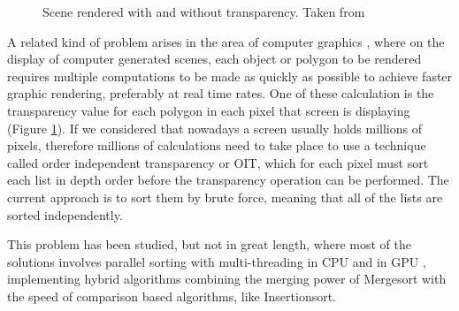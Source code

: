 \documentclass[a4paper,12pt]{article}
\begin{document}
\begin{figure}[H]
\centering
{}
\hfill %
\caption{Scene rendered with and without transparency. Taken from \cite{Arch2015}}
\label{fig:Transp}
\end{figure}

A related kind of problem arises in the area of computer graphics \cite{Arch2015}, where on the display of computer generated scenes, each object or polygon to be rendered requires multiple computations to be made as quickly as possible to achieve faster graphic rendering, preferably at real time rates. One of these calculation is the transparency value for each polygon in each pixel that screen is displaying (Figure \ref{fig:Transp}). If we considered that nowadays a screen usually holds millions of pixels, therefore millions of calculations need to take place to use a technique called order independent transparency or OIT, which for each pixel must sort each list in depth order before the transparency operation can be performed. The current approach is to sort them by brute force, meaning that all of the lists are sorted independently.

This problem has been studied, but not in great length, where most of the solutions involves parallel sorting with multi-threading in CPU \cite{han2002integer} and in GPU \cite{hou2017fast},  implementing hybrid algorithms combining the merging power of Mergesort with the speed of comparison based algorithms, like Insertionsort. 
\\
\end{document}
